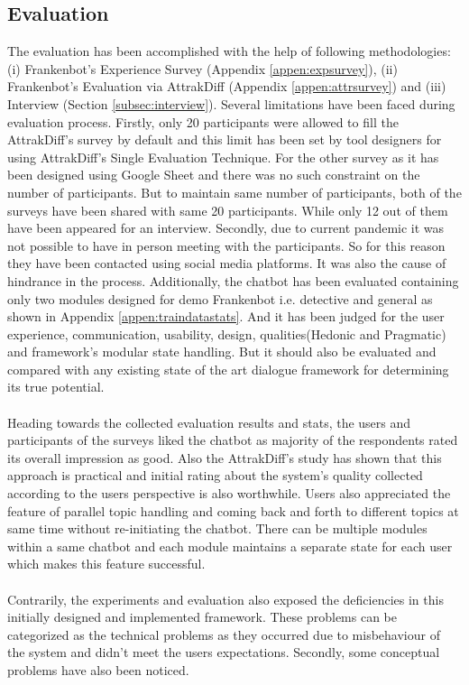 \subsection{Evaluation}
The evaluation has been accomplished with the help of following methodologies: (i) Frankenbot's Experience Survey (Appendix \ref{appen:expsurvey}), (ii) Frankenbot's Evaluation via AttrakDiff (Appendix \ref{appen:attrsurvey}) and (iii) Interview (Section \ref{subsec:interview}). Several limitations have been faced during evaluation process. Firstly, only 20 participants were allowed to fill the AttrakDiff's survey by default and this limit has been set by tool designers for using AttrakDiff's Single Evaluation Technique. For the other survey as it has been designed using Google Sheet and there was no such constraint on the number of participants. But to maintain same number of participants, both of the surveys have been shared with same 20 participants. While only 12 out of them have been appeared for an interview. Secondly, due to current pandemic it was not possible to have in person meeting with the participants. So for this reason they have been contacted using social media platforms. It was also the cause of hindrance in the process. Additionally, the chatbot has been evaluated containing only two modules designed for demo Frankenbot i.e. detective and general as shown in Appendix \ref{appen:traindatastats}. And it has been judged for the user experience, communication, usability, design, qualities(Hedonic and Pragmatic) and framework's modular state handling. But it should also be evaluated and compared with any existing state of the art dialogue framework for determining its true potential.
\\~\\
Heading towards the collected evaluation results and stats, the users and participants of the surveys liked the chatbot as majority of the respondents rated its overall impression as good. Also the AttrakDiff's study has shown that this approach is practical and initial rating about the system's quality collected according to the users perspective is also worthwhile. Users also appreciated the feature of parallel topic handling and coming back and forth to different topics at same time without re-initiating the chatbot. There can be multiple modules within a same chatbot and each module maintains a separate state for each user which makes this feature successful.
\\~\\
Contrarily, the experiments and evaluation also exposed the deficiencies in this initially designed and implemented framework. These problems can be categorized as the technical problems as they occurred due to misbehaviour of the system and didn't meet the users expectations. Secondly, some conceptual problems have also been noticed.
